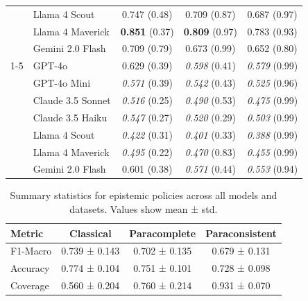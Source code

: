 \begin{table}[htbp]
\begin{tabular}{ll|ccc}
 & Llama 4 Scout & 0.747 (0.48) & 0.709 (0.87) & 0.687 (0.97) \\
 & Llama 4 Maverick & \textbf{0.851} (0.37) & \textbf{0.809} (0.97) & 0.783 (0.93) \\
 & Gemini 2.0 Flash & 0.709 (0.79) & 0.673 (0.99) & 0.652 (0.80) \\
\cline{1-5}
\multirow{7}{*}{FACTScore} & GPT-4o & 0.629 (0.39) & \textit{0.598} (0.41) & \textit{0.579} (0.99) \\
 & GPT-4o Mini & \textit{0.571} (0.39) & \textit{0.542} (0.43) & \textit{0.525} (0.96) \\
 & Claude 3.5 Sonnet & \textit{0.516} (0.25) & \textit{0.490} (0.53) & \textit{0.475} (0.99) \\
 & Claude 3.5 Haiku & \textit{0.547} (0.27) & \textit{0.520} (0.29) & \textit{0.503} (0.99) \\
 & Llama 4 Scout & \textit{0.422} (0.31) & \textit{0.401} (0.33) & \textit{0.388} (0.99) \\
 & Llama 4 Maverick & \textit{0.495} (0.22) & \textit{0.470} (0.83) & \textit{0.455} (0.99) \\
 & Gemini 2.0 Flash & 0.601 (0.38) & \textit{0.571} (0.44) & \textit{0.553} (0.94) \\
\bottomrule
\end{tabular}
\end{table}

\begin{table}[htbp]
\centering
\caption{Summary statistics for epistemic policies across all models and datasets. Values show mean ± std.}
\begin{tabular}{l|ccc}
\toprule
\textbf{Metric} & \textbf{Classical} & \textbf{Paracomplete} & \textbf{Paraconsistent} \\
\midrule
F1-Macro & 0.739 ± 0.143 & 0.702 ± 0.135 & 0.679 ± 0.131 \\
Accuracy & 0.774 ± 0.104 & 0.751 ± 0.101 & 0.728 ± 0.098 \\
Coverage & 0.560 ± 0.204 & 0.760 ± 0.214 & 0.931 ± 0.070 \\
\bottomrule
\end{tabular}
\end{table}

